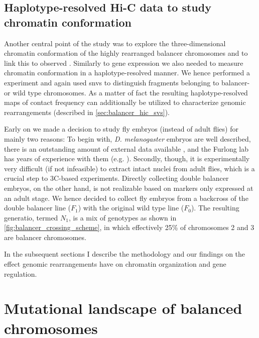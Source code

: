 \subsection{Haplotype-resolved Hi-C data to study chromatin conformation}
\label{sec:balancer_study_design_hic}

Another central point of the study was to explore the three-dimensional
chromatin conformation of the highly rearranged balancer chromosomes and to link
this to observed \ase. Similarly to gene expression we also needed to measure
chromatin conformation in a haplotype-resolved manner. We hence performed a \hic
experiment and again used \acp{snv} to distinguish fragments belonging to
balancer- or wild type chromosomes. As a matter of fact the resulting
haplotype-resolved maps of contact frequency can additionally be utilized to
characterize genomic rearrangements (described in \cref{sec:balancer_hic_svs}).

Early on we made a decision to study fly embryos (instead of adult flies) for
mainly two reasons: To begin with, \textit{D. melanogaster} embryos are well
described, there is an outstanding amount of external data available
\citep{Gramates2017,Celniker2009}, and the Furlong lab has years of experience
with them (e.g. \cite{Furlong2001,Ghavi-Helm2014}). Secondly, though,
it is experimentally very difficult (if not infeasible) to extract intact
nuclei from adult flies, which is a crucial step to 3C-based experiments.
Directly collecting double balancer embryos, on the other hand, is not
realizable based on markers only expressed at an adult stage. We hence decided
to collect fly embryos from a backcross of the double balancer line ($F_1$) with
the original wild type line ($F_0$). The resulting generatio, termed $N_1$, is a
mix of genotypes as shown in \cref{fig:balancer_crossing_scheme}, in which
effectively 25\% of chromosomes 2 and 3 are balancer chromosomes.

In the subsequent sections I describe the methodology and our findings on the
effect genomic rearrangements have on chromatin organization and gene regulation.







\section{Mutational landscape of balanced chromosomes}
\label{sec:balancer_mutational_landscape}


